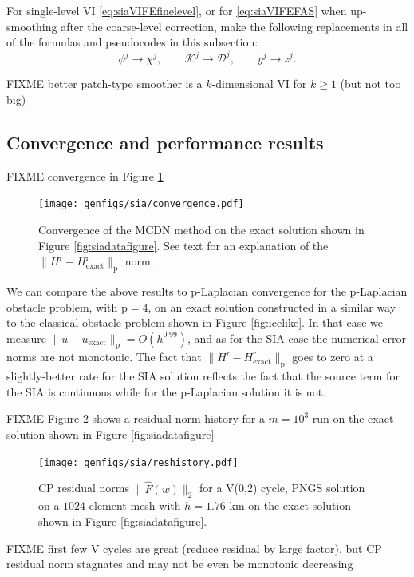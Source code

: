 \documentclass[letterpaper,final,12pt,reqno]{amsart}
\theoremstyle{claim}
\newcommand{\pp}{{\text{p}}}
\newcommand{\rr}{{\text{r}}}
\numberwithin{equation}{section}
\numberwithin{figure}{section}
\numberwithin{table}{section}
\numberwithin{theorem}{section}
\begin{document}
For single-level VI \eqref{eq:siaVIFEfinelevel}, or for \eqref{eq:siaVIFEFAS} when up-smoothing after the coarse-level correction, make the following replacements in all of the formulas and pseudocodes in this subsection:
\begin{equation}
   \phi^j \to \chi^j, \qquad \mathcal{K}^j \to \mathcal{D}^j, \qquad y^j \to z^j.  \label{eq:pngssinglelevelreplacements}
\end{equation}

FIXME better patch-type smoother is a $k$-dimensional VI for $k\ge 1$ (but not too big)

\subsection{Convergence and performance results} \label{subsec:siaperformance}  FIXME convergence in Figure \ref{fig:siaconv}

\begin{figure}
\texttt{[image: genfigs/sia/convergence.pdf]}
\caption{Convergence of the MCDN method on the exact solution shown in Figure \ref{fig:siadatafigure}.  See text for an explanation of the $\|H^\rr-H_{\text{exact}}^\rr\|_\pp$ norm.}
\label{fig:siaconv}
\end{figure}

We can compare the above results to $\pp$-Laplacian convergence for the $\pp$-Laplacian obstacle problem, with $\pp=4$, on an exact solution constructed in a similar way to the classical obstacle problem shown in Figure \ref{fig:icelike}.  In that case we measure $\|u-u_{\text{exact}}\|_\pp=O(h^{0.99})$, and as for the SIA case the numerical error norms are not monotonic.  The fact that $\|H^\rr-H_{\text{exact}}^\rr\|_\pp$ goes to zero at a slightly-better rate for the SIA solution reflects the fact that the source term for the SIA is continuous while for the $\pp$-Laplacian solution it is not.

FIXME Figure \ref{fig:siareshistory} shows a residual norm history for a $m=10^3$ run on the exact solution shown in Figure \ref{fig:siadatafigure}

\begin{figure}
\texttt{[image: genfigs/sia/reshistory.pdf]}
\caption{CP residual norms $\|\hat F(w)\|_2$ for a V(0,2) cycle, PNGS solution on a $1024$ element mesh with $h=1.76$ km on the exact solution shown in Figure \ref{fig:siadatafigure}.}
\label{fig:siareshistory}
\end{figure}

FIXME first few V cycles are great (reduce residual by large factor), but CP residual norm stagnates and may not be even be monotonic decreasing
\end{document}
